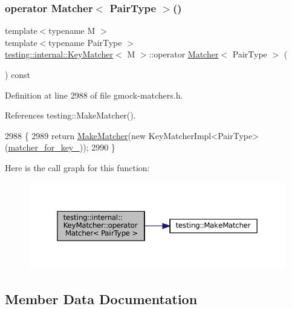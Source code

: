 \subsubsection{\texorpdfstring{operator Matcher$<$ Pair\+Type $>$()}{operator Matcher< PairType >()}}
{\footnotesize\ttfamily template$<$typename M $>$ \\
template$<$typename Pair\+Type $>$ \\
\hyperlink{classtesting_1_1internal_1_1KeyMatcher}{testing\+::internal\+::\+Key\+Matcher}$<$ M $>$\+::operator \hyperlink{classtesting_1_1Matcher}{Matcher}$<$ Pair\+Type $>$ (\begin{DoxyParamCaption}{ }\end{DoxyParamCaption}) const\hspace{0.3cm}{\ttfamily [inline]}}



Definition at line 2988 of file gmock-\/matchers.\+h.



References testing\+::\+Make\+Matcher().


\begin{DoxyCode}
2988                                      \{
2989     \textcolor{keywordflow}{return} \hyperlink{namespacetesting_a37fd8029ac00e60952440a3d9cca8166}{MakeMatcher}(\textcolor{keyword}{new} KeyMatcherImpl<PairType>(\hyperlink{classtesting_1_1internal_1_1KeyMatcher_a78174b3635ea2d666d78a62b78a9f5e6}{matcher\_for\_key\_}));
2990   \}
\end{DoxyCode}
Here is the call graph for this function\+:
\nopagebreak
\begin{figure}[H]
\begin{center}
\leavevmode
\includegraphics[width=350pt]{classtesting_1_1internal_1_1KeyMatcher_aa3861b06dd9e3255a7c1c013ddf88fb5_cgraph}
\end{center}
\end{figure}


\subsection{Member Data Documentation}
\mbox{\label{classtesting_1_1internal_1_1KeyMatcher_a78174b3635ea2d666d78a62b78a9f5e6}} 

